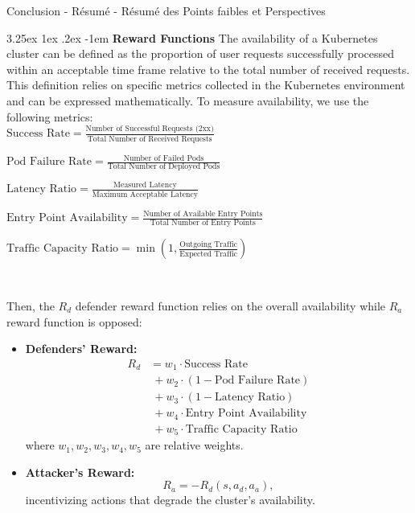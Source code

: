 \documentclass[conference]{IEEEtran}
\makeatletter
\renewcommand\paragraph{\@startsection{paragraph}{5}{\z@}%
  {3.25ex \@plus1ex \@minus.2ex}%
  {-1em}%
  {\normalfont\normalsize\bfseries}}
\makeatother
\begin{document}
Conclusion
 - Résumé
 - Résumé des Points faibles et Perspectives



\noindent \paragraph{\textbf{Reward Functions}} The availability of a Kubernetes cluster can be defined as the proportion of user requests successfully processed within an acceptable time frame relative to the total number of received requests. This definition relies on specific metrics collected in the Kubernetes environment and can be expressed mathematically.
To measure availability, we use the following metrics:\\

\noindent $
\text{Success Rate} = \frac{\text{Number of Successful Requests (2xx)}}{\text{Total Number of Received Requests}}
$

\noindent $
\text{Pod Failure Rate} = \frac{\text{Number of Failed Pods}}{\text{Total Number of Deployed Pods}}
$

\noindent $
\text{Latency Ratio} = \frac{\text{Measured Latency}}{\text{Maximum Acceptable Latency}}
$

\noindent $
\text{Entry Point Availability} = \frac{\text{Number of Available Entry Points}}{\text{Total Number of Entry Points}}
$

\noindent $
\text{Traffic Capacity Ratio} = \min\left(1, \frac{\text{Outgoing Traffic}}{\text{Expected Traffic}}\right)
$

\

\noindent Then, the $R_d$ defender reward function relies on the overall availability while $R_a$ reward function is opposed:
\begin{itemize}
    \item \textbf{Defenders' Reward:}
    \begin{align*}
        R_d & = w_1 \cdot \text{Success Rate} \\
            & \ + w_2 \cdot (1 - \text{Pod Failure Rate}) \\
            & \ + w_3 \cdot (1 - \text{Latency Ratio}) \\
            & \ + w_4 \cdot \text{Entry Point Availability} \\
            & \ + w_5 \cdot \text{Traffic Capacity Ratio}
    \end{align*}
    where \(w_1, w_2, w_3, w_4, w_5\) are relative weights.
    \item \textbf{Attacker's Reward:}
    $$
    R_a = -R_d(s, a_d, a_a),
    $$
    incentivizing actions that degrade the cluster's availability.
\end{itemize}
\end{document}
